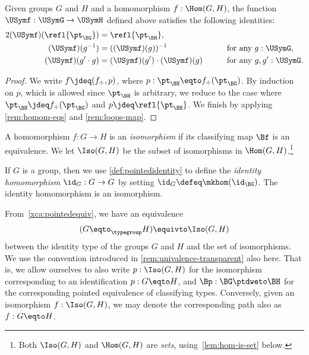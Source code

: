 \begin{lemma}\label{lem:grouphomomaxioms}
  Given groups $G$ and $H$ and a homomorphism $f : \Hom(G,H)$, the function $\USymf : \USymG \to \USymH$ defined above satisfies
  the following identities:
  \begin{alignat}2
    \label{gp-homo-unit} (\USymf) ( \refl {\pt_{\BG}} )
    &= \refl{\pt_{\BH}},   &\qquad&                                        \\
    \label{gp-homo-inv}  (\USymf) (g ^ {-1})
    &= ((\USymf) (g))^{-1}                   && \text{for any $g : \USymG$,} \\
    \label{gp-homo-comp} (\USymf) (g' \cdot g)
    &=  (\USymf) (g') \cdot  (\USymf) (g) && \text{for any $g, g' : \USymG$.}
  \end{alignat}
\end{lemma}

\begin{proof}
  We write $f \jdeq (f_\div,p)$, where $p : \pt_{\BH} \eqto f_\div (\pt_{\BG})$.
  By induction on $p$, which is allowed since $\pt_{\BH}$ is arbitrary,
  we reduce to the case where $\pt_{\BH} \jdeq f_\div (\pt_{\BG})$
  and $p\jdeq \refl{\pt_{\BH}}$.
  We finish by applying \cref{rem:homom-eqs} and \ref{rem:loops-map}.
\end{proof}

\begin{definition}\label{def:groupisomorphism}
  A homomorphism $f : G\to H$ is an \emph{isomorphism} if its classifying map $\Bf$ is an equivalence.
  We let $\Iso(G,H)$ be the subset of isomorphisms in $\Hom(G, H)$.\footnote{%
    Both $\Iso(G,H)$ and $\Hom(G,H)$ are \emph{sets},
    using~\cref{lem:hom-is-set} below.}
\end{definition}

\begin{definition}\label{def:identity-group-homomorphism}
  If $G$ is a group, then we use \cref{def:pointedidentity} to define the \emph{identity homomorphism} $\id_G : G\to G$ by
  setting $\id_G \defeq \mkhom (\id_\BG)$.  The
  identity homomorphism is an isomorphism.
\end{definition}

\begin{remark}
  \label{remark:groupsasunivalenttype} From~\cref{xca:pointedequiv},
  we have an equivalence
  \[
    (G\eqto_\typegroup H)\equivto \Iso(G,H)
  \]
  between the identity type of the groups $G$ and $H$ and the 
  set of isomorphisms. We use the convention introduced in
  \cref{rem:univalence-transparent} also here. That is,
  we allow ourselves to also write $p : \Iso(G,H)$ for the isomorphism
  corresponding to an identification $p:G\eqto H$,
  and $\Bp : \BG \ptdweto \BH$ for the corresponding pointed equivalence
  of classifying types. Conversely, given an isomorphism
  $f : \Iso(G,H)$, we may denote the corresponding path
  also as $f:G\eqto H$.
\end{remark}


